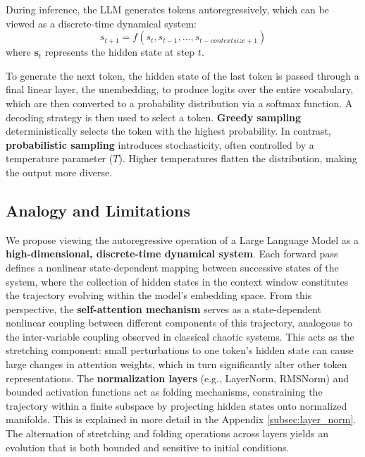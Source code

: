 \documentclass[a4paper,12pt]{article}
\begin{document}
During inference, the LLM generates tokens autoregressively, which can be viewed as a discrete-time dynamical system:
\begin{equation}
     s_{t+1} = f(s_t, s_{t-1}, ..., s_{t-context size+1})
\end{equation}
where $\mathbf{s}_t$ represents the hidden state at step $t$. 

To generate the next token, the hidden state of the last token is passed through a final linear layer, the unembedding, to produce logits over the entire vocabulary, which are then converted to a probability distribution via a softmax function. A decoding strategy is then used to select a token. \textbf{Greedy sampling} deterministically selects the token with the highest probability. In contrast, \textbf{probabilistic sampling} introduces stochasticity, often controlled by a temperature parameter ($T$). Higher temperatures flatten the distribution, making the output more diverse.



\subsection{Analogy and Limitations}
\label{subsec:analogy_limitations}
We propose viewing the autoregressive operation of a Large Language Model as a \textbf{high-dimensional, discrete-time dynamical system}. Each forward pass defines a nonlinear state-dependent mapping between successive states of the system, where the collection of hidden states in the context window constitutes the trajectory evolving within the model's embedding space. From this perspective, the \textbf{self-attention mechanism} serves as a state-dependent nonlinear coupling between different components of this trajectory, analogous to the inter-variable coupling observed in classical chaotic systems. This acts as the stretching component: small perturbations to one token's hidden state can cause large changes in attention weights, which in turn significantly alter other token representations. The \textbf{normalization layers} (e.g., LayerNorm, RMSNorm) and bounded activation functions act as folding mechanisms, constraining the trajectory within a finite subspace by projecting hidden states onto normalized manifolds. This is explained in more detail in the Appendix \ref{subsec:layer_norm}. The alternation of stretching and folding operations across layers yields an evolution that is both bounded and sensitive to initial conditions.
\end{document}
